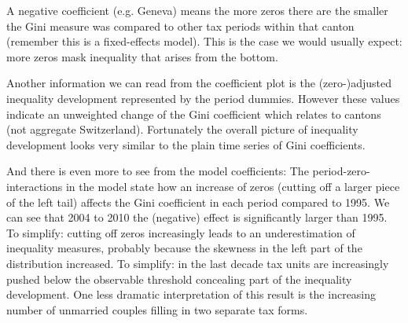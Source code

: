\documentclass[twoside]{article}\usepackage[]{graphicx}\usepackage[]{color}
\begin{document}
\begin{multicols}{2}
A negative coefficient (e.g. Geneva) means the more zeros there are the smaller the Gini measure was compared to other tax periods within that canton (remember this is a fixed-effects model). This is the case we would usually expect: more zeros mask inequality that arises from the bottom.

Another information we can read from the coefficient plot is the (zero-)adjusted inequality development represented by the period dummies. However these values indicate an unweighted change of the Gini coefficient which relates to cantons (not aggregate Switzerland). Fortunately the overall picture of inequality development looks very similar to the plain time series of Gini coefficients. 

And there is even more to see from the model coefficients: The period-zero-interactions in the model state how an increase of zeros (cutting off a larger piece of the left tail) affects the Gini coefficient in each period compared to 1995. We can see that 2004 to 2010 the (negative) effect is significantly larger than 1995. To simplify: cutting off zeros increasingly leads to an underestimation of inequality measures, probably because the skewness in the left part of the distribution increased. To simplify: in the last decade tax units are increasingly pushed below the observable threshold concealing part of the inequality development. One less dramatic interpretation of this result is the increasing number of unmarried couples filling in two separate tax forms.






\end{multicols}
\end{document}
